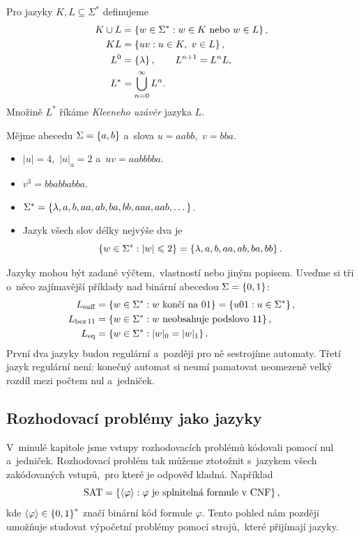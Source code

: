 \begin{definition}
    Pro jazyky $K,L\subseteq\Sigma^*$ definujeme
    \begin{align*}
        K\cup L&=\left\{w\in\Sigma^*:w\in K\text{ nebo }w\in L\right\},\\
        KL&=\left\{uv:u\in K,\ v\in L\right\},\\
        L^0&=\left\{\lambda\right\},\qquad L^{n+1}=L^nL,\\
        L^*&=\bigcup_{n=0}^{\infty}L^n.
    \end{align*}
    Množině $L^*$ říkáme \emph{Kleeneho uzávěr} jazyka $L$.
\end{definition}

\begin{example}
    Mějme abecedu $\Sigma=\left\{a,b\right\}$ a~slova $u=aabb$,~$v=bba$.
    \begin{itemize}
        \item $|u|=4$,~$|u|_a=2$ a~$uv=aabbbba$.
        \item $v^3=bbabbabba$.
        \item $\Sigma^*=\left\{\lambda,a,b,aa,ab,ba,bb,aaa,aab,\dots\right\}$.
        \item Jazyk všech slov délky nejvýše dva je
        \[\left\{w\in\Sigma^*:|w|\leqslant2\right\}=\left\{\lambda,a,b,aa,ab,ba,bb\right\}.\]
    \end{itemize}
\end{example}

Jazyky mohou být zadané výčtem,~vlastností nebo jiným popisem. Uveďme si tři o~něco zajímavější příklady nad binární abecedou $\Sigma=\left\{0,1\right\}$:
\begin{align*}
    L_{\mathrm{suff}}
        &=\left\{w\in\Sigma^*: \text{$w$ končí na $01$}\right\}
          =\left\{u01:u\in\Sigma^*\right\},\\
    L_{\mathrm{bez}\,11}
        &=\left\{w\in\Sigma^*: \text{$w$ neobsahuje podslovo $11$}\right\},\\
    L_{\mathrm{eq}}
        &=\left\{w\in\Sigma^*:|w|_0=|w|_1\right\}.
\end{align*}
První dva jazyky budou regulární a~později pro ně sestrojíme automaty. Třetí jazyk regulární není: konečný automat si neumí pamatovat neomezeně velký rozdíl mezi počtem nul a~jedniček.

\subsection{Rozhodovací problémy jako jazyky}

V~minulé kapitole jsme vstupy rozhodovacích problémů kódovali pomocí nul a~jedniček. Rozhodovací problém tak můžeme ztotožnit s~jazykem všech zakódovaných vstupů,~pro které je odpověď kladná. Například
\[\operatorname{SAT}=\left\{\langle\varphi\rangle:\text{$\varphi$ je splnitelná formule v~CNF}\right\},\]
kde $\langle\varphi\rangle\in\left\{0,1\right\}^*$ značí binární kód formule $\varphi$. Tento pohled nám později umožňuje studovat výpočetní problémy pomocí strojů,~které přijímají jazyky.

